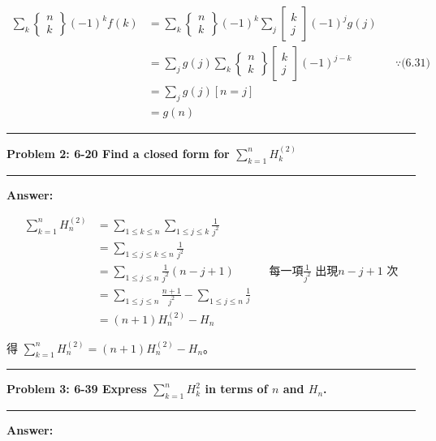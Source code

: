 \documentclass[11pt]{article}
\newcommand\question[2]{\vspace{.25in}\hrule\textbf{#1: #2}\vspace{.5em}\hrule\vspace{.10in}}
\renewcommand\part[1]{\vspace{.10in}\textbf{#1}}
\begin{document}
\begin{itemize}
\begin{align*}
			\sum_{k} \begin{Bmatrix} n \\ k \end{Bmatrix} (-1)^{k} f(k)
				&=	\sum_{k} \begin{Bmatrix} n \\ k \end{Bmatrix} (-1)^{k} 
					\sum_{j} \begin{bmatrix} k \\ j \end{bmatrix} (-1)^{j} g(j) \\
				&=	\sum_{j} g(j) \sum_{k} \begin{Bmatrix} n \\ k \end{Bmatrix} 
					\begin{bmatrix} k \\ j \end{bmatrix} (-1)^{j-k} 
					&& \because \text{(6.31)} \\
				&= \sum_{j} g(j) [n = j] \\
				&= g(n)
		\end{align*}
\end{itemize}

\newpage

\question{Problem 2} {6-20 Find a closed form for $\sum_{k=1}^{n} H_k^{(2)}$
}

\part{Answer:}

\begin{align*}
\sum_{k=1}^{n} H_n^{(2)} 
	&= \sum_{1 \le k \le n} \sum_{1 \le j \le k} \frac{1}{j^2} \\
	&= \sum_{1 \le j \le k \le n} \frac{1}{j^2} \\
	&= \sum_{1 \le j \le n} \frac{1}{j^2} (n - j + 1) 
		&& \text{每一項} \frac{1}{j^2} \text{ 出現} n - j + 1 \text{ 次} \\
	&= \sum_{1 \le j \le n} \frac{n+1}{j^2} - \sum_{1 \le j \le n} \frac{1}{j} \\
	&= (n+1) H_n^{(2)} - H_n
\end{align*}

得 $\sum_{k=1}^{n} H_n^{(2)} = (n+1) H_n^{(2)} - H_n$。

\question{Problem 3} {6-39 Express $\sum_{k=1}^{n} H_k^2$ in terms of $n$ and $H_n$.
}

\part{Answer:}
\end{document}

